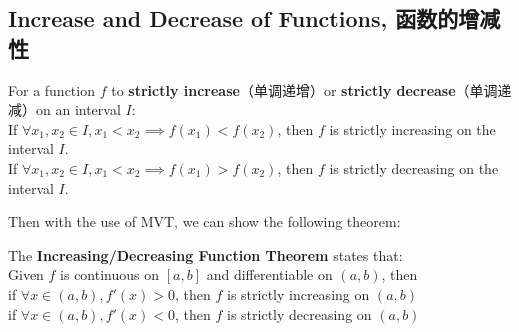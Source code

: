 \subsection{Increase and Decrease of Functions, 函数的增减性}
\begin{definition}
    For a function $f$ to \textbf{strictly increase}（单调递增）or \textbf{strictly decrease}（单调递减）on an interval $I$: \\
    If $\forall x_1, x_2 \in I, x_1 < x_2 \implies f(x_1) < f(x_2)$, then $f$ is strictly increasing on the interval $I$. \\
    If $\forall x_1, x_2 \in I, x_1 < x_2 \implies f(x_1) > f(x_2)$, then $f$ is strictly decreasing on the interval $I$.
\end{definition}
Then with the use of MVT, we can show the following theorem:
\begin{theorem}
    The \textbf{Increasing/Decreasing Function Theorem} states that: \\
    Given $f$ is continuous on $[a, b]$ and differentiable on $(a, b)$, then \\
    if $\forall x \in (a, b), f'(x) > 0$, then $f$ is strictly increasing on $(a, b)$ \\
    if $\forall x \in (a, b), f'(x) < 0$, then $f$ is strictly decreasing on $(a, b)$
\end{theorem}
\newpage